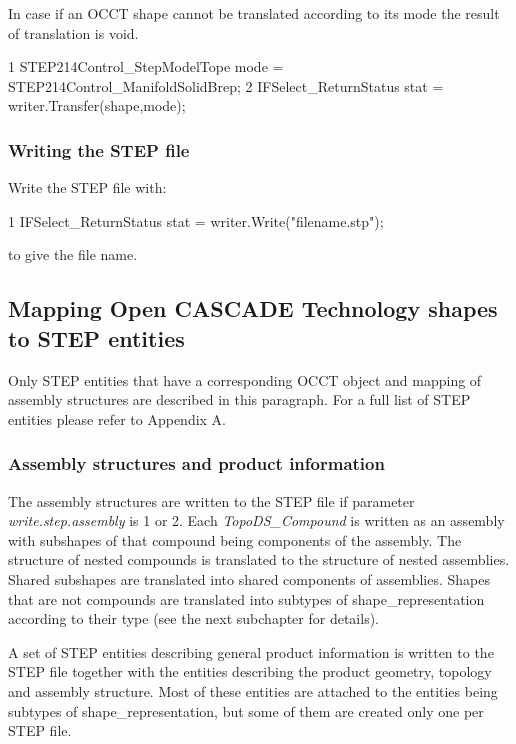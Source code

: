 In case if an O\+C\+CT shape cannot be translated according to its mode the result of translation is void. 
\begin{DoxyCode}
1 STEP214Control\_StepModelTope mode = STEP214Control\_ManifoldSolidBrep; 
2 IFSelect\_ReturnStatus stat = writer.Transfer(shape,mode); 
\end{DoxyCode}
\hypertarget{occt_user_guides__step_occt_step_3_3_4}{}\subsubsection{Writing the S\+T\+E\+P file}\label{occt_user_guides__step_occt_step_3_3_4}
Write the S\+T\+EP file with\+: 
\begin{DoxyCode}
1 IFSelect\_ReturnStatus stat = writer.Write("filename.stp"); 
\end{DoxyCode}
 to give the file name.\hypertarget{occt_user_guides__step_occt_step_3_4}{}\subsection{Mapping Open C\+A\+S\+C\+A\+D\+E Technology shapes to S\+T\+E\+P entities}\label{occt_user_guides__step_occt_step_3_4}
Only S\+T\+EP entities that have a corresponding O\+C\+CT object and mapping of assembly structures are described in this paragraph. For a full list of S\+T\+EP entities please refer to Appendix A.\hypertarget{occt_user_guides__step_occt_step_3_4_1}{}\subsubsection{Assembly structures and product information}\label{occt_user_guides__step_occt_step_3_4_1}
The assembly structures are written to the S\+T\+EP file if parameter {\itshape write.\+step.\+assembly} is 1 or 2. Each {\itshape Topo\+D\+S\+\_\+\+Compound} is written as an assembly with subshapes of that compound being components of the assembly. The structure of nested compounds is translated to the structure of nested assemblies. Shared subshapes are translated into shared components of assemblies. Shapes that are not compounds are translated into subtypes of shape\+\_\+representation according to their type (see the next subchapter for details).

A set of S\+T\+EP entities describing general product information is written to the S\+T\+EP file together with the entities describing the product geometry, topology and assembly structure. Most of these entities are attached to the entities being subtypes of shape\+\_\+representation, but some of them are created only one per S\+T\+EP file.

